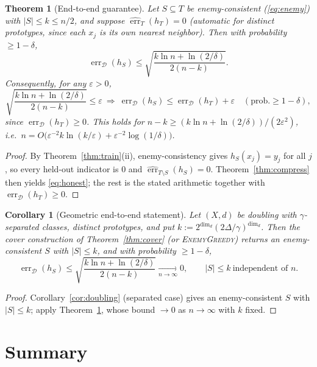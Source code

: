 \documentclass{amsart}
\newtheorem{theorem}{Theorem}
\newtheorem{corollary}{Corollary}
\theoremstyle{definition}
\DeclareMathOperator{\err}{err}
\begin{document}
\begin{theorem}[End-to-end guarantee]\label{thm:honest}
Let $S\subseteq T$ be enemy-consistent (\eqref{eq:enemy}) with $|S|\le k\le n/2$,
and suppose $\widehat{\err}_T(h_T)=0$ (automatic for distinct prototypes, since
each $x_j$ is its own nearest neighbor). Then with probability $\ge1-\delta$,
\begin{equation}\label{eq:honest}
\err_\mathcal D(h_S)\le\sqrt{\frac{k\ln n+\ln(2/\delta)}{2(n-k)}} .
\end{equation}
Consequently, for any $\varepsilon>0$,
\[
\sqrt{\frac{k\ln n+\ln(2/\delta)}{2(n-k)}}\le\varepsilon\ \Longrightarrow\
\err_\mathcal D(h_S)\le\err_\mathcal D(h_T)+\varepsilon\quad(\text{prob.}\ge1-\delta),
\]
since $\err_\mathcal D(h_T)\ge0$. This holds for
$n-k\ge(k\ln n+\ln(2/\delta))/(2\varepsilon^2)$, i.e.\
$n=O\!\big(\varepsilon^{-2}k\ln(k/\varepsilon)+\varepsilon^{-2}\log(1/\delta)\big)$.
\end{theorem}

\begin{proof}
By Theorem~\ref{thm:train}(ii), enemy-consistency gives $h_S(x_j)=y_j$ for all
$j$, so every held-out indicator is $0$ and
$\widehat{\err}_{T\setminus S}(h_S)=0$. Theorem~\ref{thm:compress} then yields
\eqref{eq:honest}; the rest is the stated arithmetic together with
$\err_\mathcal D(h_T)\ge0$.
\end{proof}

\begin{corollary}[Geometric end-to-end statement]\label{cor:end}
Let $(X,d)$ be doubling with $\gamma$-separated classes, distinct prototypes,
and put $k:=2^{\dim_d}(2\Delta/\gamma)^{\dim_d}$. Then the cover construction of
Theorem~\ref{thm:cover} (or \textsc{EnemyGreedy}) returns an enemy-consistent
$S$ with $|S|\le k$, and with probability $\ge1-\delta$,
\[
\err_\mathcal D(h_S)\le\sqrt{\frac{k\ln n+\ln(2/\delta)}{2(n-k)}}
\xrightarrow[n\to\infty]{}0,\qquad |S|\le k\ \text{independent of }n .
\]
\end{corollary}

\begin{proof}
Corollary~\ref{cor:doubling} (separated case) gives an enemy-consistent $S$ with
$|S|\le k$; apply Theorem~\ref{thm:honest}, whose bound $\to0$ as $n\to\infty$
with $k$ fixed.
\end{proof}

\section{Summary}\label{sec:summary}
\end{document}
